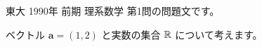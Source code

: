 \documentclass{article}
\begin{document}
東大 1990年 前期 理系数学 第1問の問題文です。

ベクトル $\bm{a} = (1, 2)$ と実数の集合 $\mathbb{R}$ について考えます。
\end{document}
